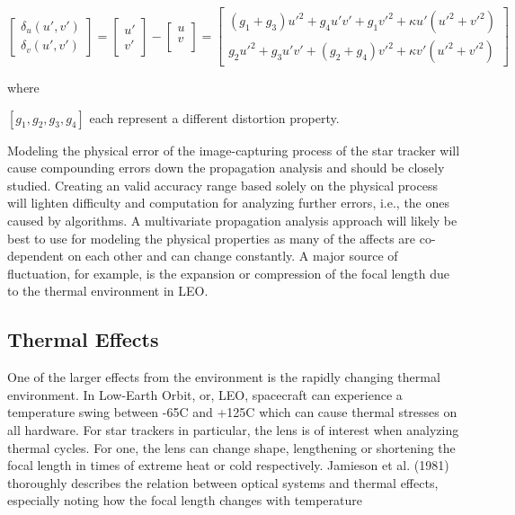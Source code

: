 \begin{equation}
    \begin{bmatrix}
        \delta_u(u', v') \\
        \delta_v(u', v')    
    \end{bmatrix}
    =
    \begin{bmatrix}
        u' \\
        v'
    \end{bmatrix}
    -
    \begin{bmatrix}
        u \\
        v \\
    \end{bmatrix}
    =
    \begin{bmatrix}
        (g_1 + g_3)u'^2 + g_4u'v' + g_1v'^2 + \kappa u'(u'^2 + v'^2) \\
        g_2u'^2 + g_3u'v' + (g_2 + g_4)v'^2 + \kappa v'(u'^2 + v'^2)
    \end{bmatrix}
\end{equation}

where 
\begin{center}
    $[g_1, g_2, g_3, g_4]$ each represent a different distortion property.
\end{center}

\par \qquad Modeling the physical error of the image-capturing process of the star tracker will cause compounding errors down the propagation analysis and should be closely studied.
Creating an valid accuracy range based solely on the physical process will lighten difficulty and computation for analyzing further errors, i.e., the ones caused by algorithms. 
A multivariate propagation analysis approach will likely be best to use for modeling the physical properties as many of the affects are co-dependent on each other and can change constantly.
A major source of fluctuation, for example, is the expansion or compression of the focal length due to the thermal environment in LEO.

\subsection*{Thermal Effects}
\par \qquad One of the larger effects from the environment is the rapidly changing thermal environment.
In Low-Earth Orbit, or, LEO, spacecraft can experience a temperature swing between -65C and +125C\cite{NASA_LEO_Env} which can cause thermal stresses on all hardware.
For star trackers in particular, the lens is of interest when analyzing thermal cycles.
For one, the lens can change shape, lengthening or shortening the focal length in times of extreme heat or cold respectively. 
Jamieson et al. (1981) thoroughly describes the relation between optical systems and thermal effects, especially noting how the focal length changes with temperature \cite{thermal_effects_in_optical_systems}

